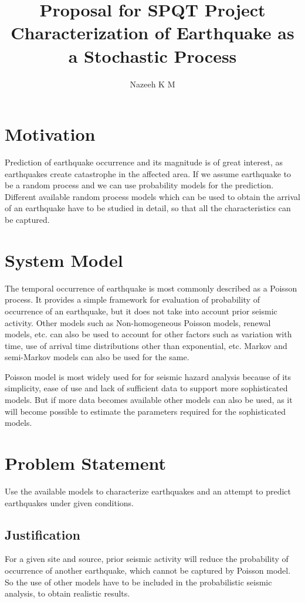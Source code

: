 \documentclass[a4paper,english,12pt]{article}
\title{\textbf{Proposal for SPQT Project\\Characterization of Earthquake as a Stochastic Process}}
\author{Nazeeh K M}
\begin{document}
\maketitle

\section{Motivation}
Prediction of earthquake occurrence and its magnitude is of great interest, as earthquakes create catastrophe in the affected area. If we assume earthquake to be a random process and we can use probability models for the prediction. Different available random process models which can be used to obtain the arrival of an earthquake have to be studied in detail, so that all the characteristics can be captured.
\section{System Model}
The temporal occurrence of earthquake is most commonly described as a Poisson process. It provides a simple framework for evaluation of probability of occurrence of an earthquake, but it does not take into account prior seismic activity. Other models such as Non-homogeneous Poisson models, renewal models, etc. can also be used to account for other factors such as variation with time, use of arrival time distributions other than exponential, etc. Markov and semi-Markov models can also be used for the same.

Poisson model is most widely used for for seismic hazard analysis because of its simplicity, ease of use and lack of sufficient data to support more sophisticated models. But if more data becomes available other models can also be used, as it will become possible to estimate the parameters required for the sophisticated models.
\section{Problem Statement}
Use the available models to characterize earthquakes and an attempt to predict earthquakes under given conditions.
\subsection{Justification}
For a given site and source, prior seismic activity will reduce the probability of occurrence of another earthquake, which cannot be captured by Poisson model. So the use of other models have to be included in the probabilistic seismic analysis, to obtain realistic results.
\end{document}
